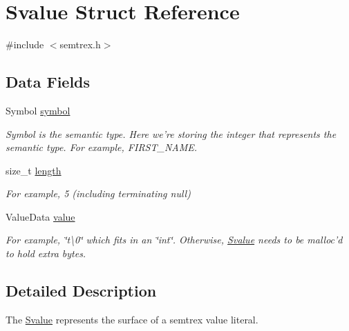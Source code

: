 \hypertarget{structSvalue}{\section{Svalue Struct Reference}
\label{structSvalue}
}


{\ttfamily \#include $<$semtrex.\+h$>$}

\subsection*{Data Fields}
\begin{DoxyCompactItemize}
\item 
\hypertarget{structSvalue_a0ad23032f404832b4ebb3d21d6ad2add}{Symbol \hyperlink{structSvalue_a0ad23032f404832b4ebb3d21d6ad2add}{symbol}}\label{structSvalue_a0ad23032f404832b4ebb3d21d6ad2add}

\begin{DoxyCompactList}\small\item\em Symbol is the semantic type. Here we're storing the integer that represents the semantic type. For example, F\+I\+R\+S\+T\+\_\+\+N\+A\+M\+E. \end{DoxyCompactList}\item 
\hypertarget{structSvalue_afe7d3d6c663be6c40232d73dc8aa49b8}{size\+\_\+t \hyperlink{structSvalue_afe7d3d6c663be6c40232d73dc8aa49b8}{length}}\label{structSvalue_afe7d3d6c663be6c40232d73dc8aa49b8}

\begin{DoxyCompactList}\small\item\em For example, 5 (including terminating null) \end{DoxyCompactList}\item 
\hypertarget{structSvalue_a1030fdddc0222a677b53dadf8ca4c51f}{Value\+Data \hyperlink{structSvalue_a1030fdddc0222a677b53dadf8ca4c51f}{value}}\label{structSvalue_a1030fdddc0222a677b53dadf8ca4c51f}

\begin{DoxyCompactList}\small\item\em For example, \char`\"{}t\textbackslash{}0\char`\"{} which fits in an \char`\"{}int\char`\"{}. Otherwise, \hyperlink{structSvalue}{Svalue} needs to be malloc'd to hold extra bytes. \end{DoxyCompactList}\end{DoxyCompactItemize}


\subsection{Detailed Description}
The \hyperlink{structSvalue}{Svalue} represents the surface of a semtrex value literal.

